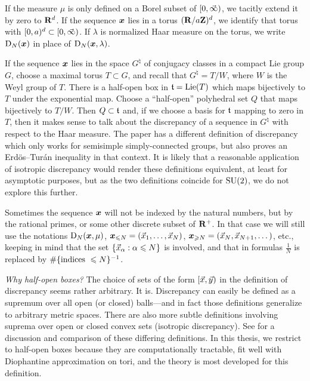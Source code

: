 If the measure $\mu$ is only defined on a Borel subset of $[0,\vec{\infty})$, we 
tacitly extend it by zero to $\mathbf{R}^d$. If the sequence ${\boldsymbol x}$ lies in a torus 
$(\mathbf{R}/a \mathbf{Z})^d$, we identify that torus with  $[0,a)^d\subset [0,\vec{\infty})$. If 
$\lambda$ is normalized Haar measure on the torus, we write $\operatorname{D}_N({\boldsymbol x})$ in 
place of $\operatorname{D}_N({\boldsymbol x}, \lambda)$. 

If the sequence ${\boldsymbol x}$ lies in the space $G^\natural$ of conjugacy classes in a 
compact Lie group $G$, choose a maximal torus $T\subset G$, and recall that 
$G^\natural = T/W$, where $W$ is the Weyl group of $T$. There is a half-open 
box in $\mathfrak{t} = \operatorname{Lie}(T)$ which maps bijectively to $T$ under the exponential 
map. Choose a ``half-open'' polyhedral set $Q$ that maps bijectively to $T/W$. 
Then $Q\subset \mathfrak{t}$ and, if we choose a basis for $\mathfrak{t}$ mapping to zero in 
$T$, then it makes sense to talk about the discrepancy of a sequence in 
$G^\natural$ with respect to the Haar measure. The paper 
\cite{rosengarten-2013} has a different definition of discrepancy which only 
works for semisimple simply-connected groups, but also proves an 
Erd\"os--Tur\'an inequality in that context. It is likely that a reasonable 
application of isotropic discrepancy would render these definitions equivalent, 
at least for asymptotic purposes, but as the two definitions coincide for 
$\operatorname{SU}(2)$, we do not explore this further. 

Sometimes the sequence ${\boldsymbol x}$ will not be indexed by the natural numbers, but 
by the rational primes, or some other discrete subset of $\mathbf{R}^+$. In that case 
we will still use the notations $\operatorname{D}_N({\boldsymbol x},\mu)$, 
${\boldsymbol x}_{\leqslant N} = (\vec{x}_1,\dots,\vec{x}_N)$, 
${\boldsymbol x}_{\geqslant N} = (\vec{x}_N,\vec{x}_{N+1},\dots)$, etc., 
keeping in mind that the set $\{\vec{x}_\alpha : \alpha \leqslant N\}$ is involved, 
and that in formulas $\frac{1}{N}$ is replaced by 
$\#\{\textnormal{indices }\leqslant N\}^{-1}$. 

\emph{Why half-open boxes?} The choice of sets of the form $[\vec{x},\vec{y})$ in the 
definition of discrepancy seems rather arbitrary. It is. Discrepancy can easily 
be defined as a supremum over all open (or closed) balls---and in fact those  
definitions generalize to arbitrary metric spaces. There are also more subtle 
definitions involving suprema over open or closed convex sets (isotropic 
discrepancy). See \cite{kuipers-niederreiter-1974} for a discussion and 
comparison of these differing definitions. In this thesis, we restrict to 
half-open boxes because they are computationally tractable, fit well with 
Diophantine approximation on tori, and the theory is most developed for this 
definition. 





